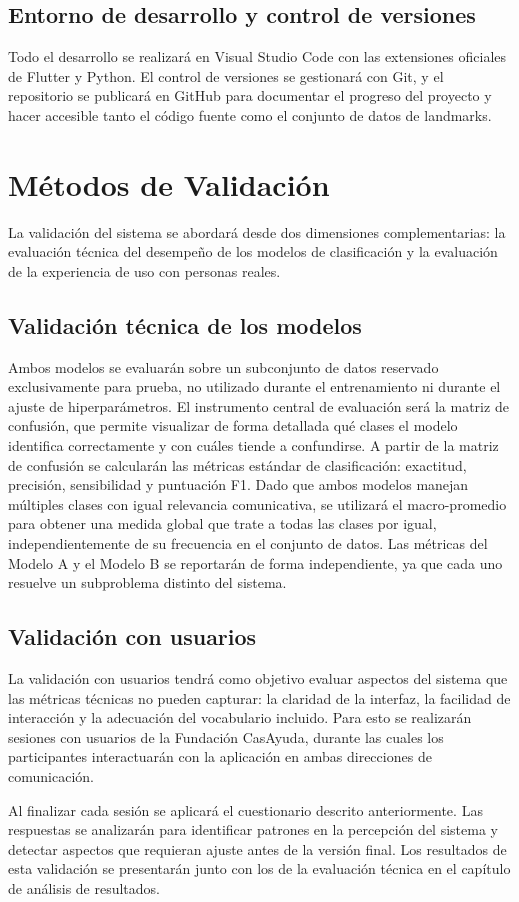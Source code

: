 \subsection{Entorno de desarrollo y control de versiones}

Todo el desarrollo se realizará en Visual Studio Code con las extensiones oficiales de
Flutter y Python. El control de versiones se gestionará con Git, y el repositorio se
publicará en GitHub para documentar el progreso del proyecto y hacer accesible tanto el
código fuente como el conjunto de datos de landmarks.

\section{Métodos de Validación}

La validación del sistema se abordará desde dos dimensiones complementarias: la
evaluación técnica del desempeño de los modelos de clasificación y la evaluación de
la experiencia de uso con personas reales.

\subsection{Validación técnica de los modelos}

Ambos modelos se evaluarán sobre un subconjunto de datos reservado exclusivamente
para prueba, no utilizado durante el entrenamiento ni durante el ajuste de
hiperparámetros. El instrumento central de evaluación será la matriz de confusión, que
permite visualizar de forma detallada qué clases el modelo identifica correctamente y
con cuáles tiende a confundirse. A partir de la matriz de confusión se calcularán las
métricas estándar de clasificación: exactitud, precisión, sensibilidad y puntuación
F1. Dado que ambos modelos manejan múltiples clases con igual relevancia comunicativa,
se utilizará el macro-promedio para obtener una medida global que trate a todas las
clases por igual, independientemente de su frecuencia en el conjunto de datos. Las
métricas del Modelo A y el Modelo B se reportarán de forma independiente, ya que cada
uno resuelve un subproblema distinto del sistema.

\subsection{Validación con usuarios}

La validación con usuarios tendrá como objetivo evaluar aspectos del sistema que las
métricas técnicas no pueden capturar: la claridad de la interfaz, la facilidad de
interacción y la adecuación del vocabulario incluido. Para esto se realizarán sesiones
con usuarios de la Fundación CasAyuda, durante las cuales los
participantes interactuarán con la aplicación en ambas direcciones de comunicación.

Al finalizar cada sesión se aplicará el cuestionario descrito anteriormente. Las
respuestas se analizarán para identificar patrones en la percepción del sistema y
detectar aspectos que requieran ajuste antes de la versión final. Los resultados de
esta validación se presentarán junto con los de la evaluación técnica en el capítulo de
análisis de resultados.
